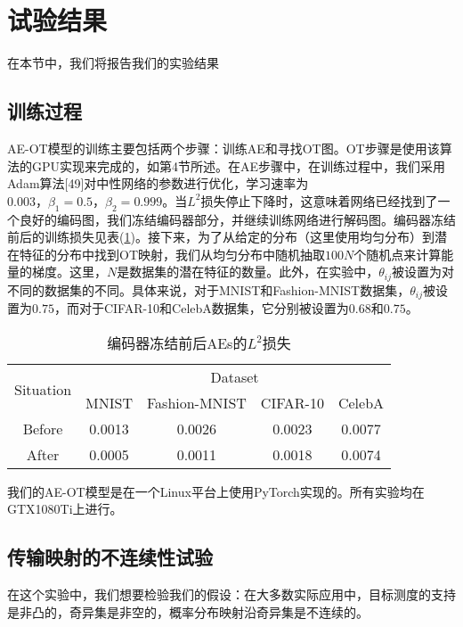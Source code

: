 
\section{试验结果}

在本节中，我们将报告我们的实验结果

\subsection{训练过程}

AE-OT模型的训练主要包括两个步骤：训练AE和寻找OT图。OT步骤是使用该算法的GPU实现来完成的，如第4节所述。在AE步骤中，在训练过程中，我们采用Adam算法[49]对中性网络的参数进行优化，学习速率为$0.003，\beta_1=0.5，\beta_2=0.999$。当$L^2$损失停止下降时，这意味着网络已经找到了一个良好的编码图，我们冻结编码器部分，并继续训练网络进行解码图。编码器冻结前后的训练损失见表(\ref{table:1})。接下来，为了从给定的分布（这里使用均匀分布）到潜在特征的分布中找到OT映射，我们从均匀分布中随机抽取$100N$个随机点来计算能量的梯度。这里，$N$是数据集的潜在特征的数量。此外，在实验中，$\theta_{ij}$被设置为对不同的数据集的不同。具体来说，对于MNIST和Fashion-MNIST数据集，$\theta_{ij}$被设置为$0.75$，而对于CIFAR-10和CelebA数据集，它分别被设置为$0.68$和$0.75$。
\begin{table}[!htbp]
	\caption{编码器冻结前后AEs的$L^2$损失}
	\label{table:1}
	\centering
	\begin{tabular}{@{}ccccc@{}}
		\toprule
		\multirow{2}{*}{Situation} & \multicolumn{4}{c}{Dataset}                \\ \cmidrule(l){2-5} 
		& MNIST  & Fashion-MNIST & CIFAR-10 & CelebA \\ \cmidrule(r){1-5}
		Before                     & 0.0013 & 0.0026        & 0.0023   & 0.0077 \\
		After                      & 0.0005 & 0.0011        & 0.0018   & 0.0074 \\ \bottomrule
	\end{tabular}
\end{table}

我们的AE-OT模型是在一个Linux平台上使用PyTorch实现的。所有实验均在GTX1080Ti上进行。

\subsection{传输映射的不连续性试验}

在这个实验中，我们想要检验我们的假设：在大多数实际应用中，目标测度的支持是非凸的，奇异集是非空的，概率分布映射沿奇异集是不连续的。

